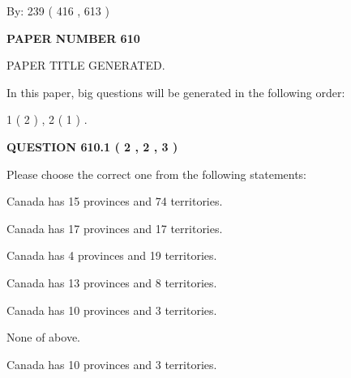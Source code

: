 \documentclass[12pt]{article}
\begin{document}
   
\hspace{1.0in} By: 
 239 ( 416 ,  613 )
   
   
   
   
\newpage 
\setcounter{page}{ 
   610001 } 
   
   
   
   
 {\textbf{ \Large{ PAPER NUMBER  610  }}}
   
   
\vspace{0.2in}
   
   
   
   
   
   
   
   
 \vspace{0.2in}
 
 
 
 
   
   
 PAPER TITLE GENERATED.
   
   
   
\vspace{0.2in}
   
In this paper, big questions will be generated in the following order: 
   
   
   1 ( 2 )
 ,
   2 ( 1 )
 .
  
\vspace{0.2in}
  
{\textbf{\Large{QUESTION
610.1 
 ( 2 , 2 , 3 )
}}}
  
  
Please choose the correct one from the following statements:
 
 
Canada has  15 provinces and  74 territories.
 
 
Canada has  17 provinces and  17 territories.
 
 
Canada has   4 provinces and  19 territories.
 
 
Canada has  13 provinces and  8 territories.
 
 
Canada has 10  provinces and 3 territories.
 
 
 None of above.
 
 
\noindent{}
 
 
Canada has 10  provinces and 3 territories.
 
\end{document}
